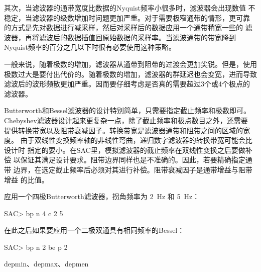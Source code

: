 其次，当滤波器的通带宽度比数据的Nyquist频率小很多时，滤波器会出现数值
不稳定，当滤波器的级数增加时问题更加严重。对于需要极窄通带的情形，更可靠
的方式是先对数据进行减采样，然后对采样后的数据应用一个通带稍宽一些的
滤波器，再将滤波后的数据插值回原始数据的采样率。当滤波通带的带宽降到
Nyquist频率的百分之几以下时很有必要使用这种策略。

一般来说，随着极数的增加，滤波器从通带到阻带的过渡会更加尖锐。但是，使用
极数过大是要付出代价的。随着极数的增加，滤波器的群延迟也会变宽，进而导致
滤波后的波形频散更加严重。因而要仔细考虑是否真的需要超过3个或4个极点的
滤波器。

Butterworth和Bessel滤波器的设计特别简单，只需要指定截止频率和极数即可。
Chebyshev滤波器设计起来更复杂一点，除了截止频率和极点数目之外，还需要
提供转换带宽以及阻带衰减因子。转换带宽是滤波器通带和阻带之间的区域的宽度。
由于双线性变换频率轴的非线性弯曲，递归数字滤波器的转换带宽可能会比设计时
指定的要小。在SAC里，模拟滤波器的截止频率在双线性变换之后要做补偿
以保证其满足设计要求。阻带边界同样也是不准确的。因此，若要精确指定通带
边界，在选定截止频率后必须对其进行补偿。阻带衰减因子是通带增益与阻带增益
的比值。

应用一个四极Butterworth滤波器，拐角频率为 \SI{2}{\Hz} 和 \SI{5}{\Hz}：
\begin{SACCode}
SAC> bp n 4 c 2 5
\end{SACCode}

在此之后如果要应用一个二极双通具有相同频率的Bessel：
\begin{SACCode}
SAC> bp n 2 be p 2
\end{SACCode}

depmin、depmax、depmen
